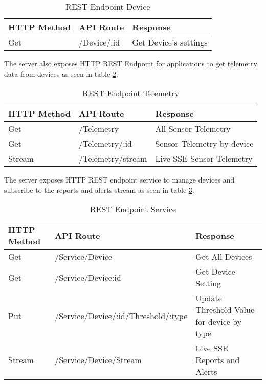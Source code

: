 \begin{table}[H]
    \centering
    \begin{tabular}{|l|l|l|}
    \hline
    \textbf{HTTP Method}    & \textbf{API Route} & \textbf{Response} \\ \hline
    Get & /Device/:id & Get Device's settings  \\ \hline
    \end{tabular}
    \caption{REST Endpoint Device}
    \label{tbl:device}
\end{table}
The server also exposes HTTP REST Endpoint for applications to get telemetry data from devices as seen in table \ref{tbl:telemetry}.

\begin{table}[H]
    \centering
    \begin{tabular}{|l|l|p{5cm}|}
    \hline
    \textbf{HTTP Method}    & \textbf{API Route} & \textbf{Response} \\ \hline
    Get & /Telemetry & All Sensor Telemetry  \\ \hline
    Get & /Telemetry/:id & Sensor Telemetry by device \\ \hline
    Stream & /Telemetry/stream & Live SSE Sensor Telemetry  \\ \hline
    \end{tabular}
    \caption{REST Endpoint Telemetry}
    \label{tbl:telemetry}
\end{table}
The server exposes HTTP REST endpoint service to manage devices and subscribe to the reports and alerts stream as seen in table \ref{tbl:service}.

    \begin{table}[H]
        \centering
        \begin{tabular}{|l|l|p{5cm}|}
        \hline
        \textbf{HTTP Method}    & \textbf{API Route} & \textbf{Response} \\ \hline
        Get & /Service/Device & Get All Devices  \\ \hline
        Get & /Service/Device:id & Get Device Setting \\ \hline
        Put & /Service/Device/:id/Threshold/:type & Update Threshold Value for device by type  \\ \hline
        Stream & /Service/Device/Stream & Live SSE Reports and Alerts \\ \hline
        \end{tabular}
        \caption{REST Endpoint Service}
        \label{tbl:service}
    \end{table}

